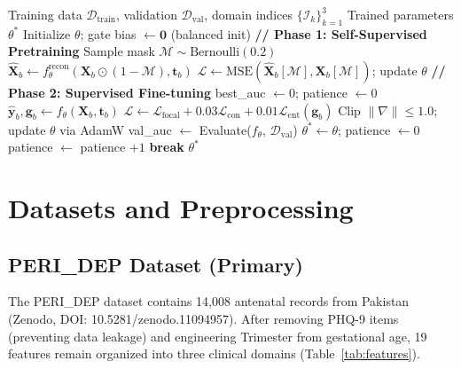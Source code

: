 \documentclass[12pt,a4paper]{article}
\begin{document}
\begin{algorithm}[htbp]
\caption{TH-DAT Complete Training Procedure}
\label{alg:thdat}
\begin{algorithmic}[1]
\REQUIRE Training data $\mathcal{D}_{\text{train}}$, validation $\mathcal{D}_{\text{val}}$, domain indices $\{\mathcal{I}_k\}_{k=1}^3$
\ENSURE Trained parameters $\theta^*$
\STATE Initialize $\theta$; gate bias $\leftarrow \mathbf{0}$ (balanced init)
\STATE \textbf{// Phase 1: Self-Supervised Pretraining}
        \STATE Sample mask $\mathcal{M} \sim \text{Bernoulli}(0.2)$
        \STATE $\hat{\mathbf{X}}_b \leftarrow f_\theta^{\text{recon}}(\mathbf{X}_b \odot (1 - \mathcal{M}), \mathbf{t}_b)$
        \STATE $\mathcal{L} \leftarrow \text{MSE}(\hat{\mathbf{X}}_b[\mathcal{M}], \mathbf{X}_b[\mathcal{M}])$; update $\theta$
    \ENDFOR
\ENDFOR
\STATE \textbf{// Phase 2: Supervised Fine-tuning}
\STATE best\_auc $\leftarrow 0$; patience $\leftarrow 0$
        \STATE $\hat{\mathbf{y}}_b, \mathbf{g}_b \leftarrow f_\theta(\mathbf{X}_b, \mathbf{t}_b)$
        \STATE $\mathcal{L} \leftarrow \mathcal{L}_{\text{focal}} + 0.03\mathcal{L}_{\text{con}} + 0.01\mathcal{L}_{\text{ent}}(\mathbf{g}_b)$
        \STATE Clip $\|\nabla\| \leq 1.0$; update $\theta$ via AdamW
    \ENDFOR
    \STATE val\_auc $\leftarrow$ Evaluate($f_\theta$, $\mathcal{D}_{\text{val}}$)
        \STATE $\theta^* \leftarrow \theta$; patience $\leftarrow 0$
    \ELSE
        \STATE patience $\leftarrow$ patience $+ 1$
    \ENDIF
     \STATE \textbf{break} \ENDIF
\ENDFOR
\RETURN $\theta^*$
\end{algorithmic}
\end{algorithm}

\section{Datasets and Preprocessing}

\subsection{PERI\_DEP Dataset (Primary)}

The PERI\_DEP dataset\cite{khan2025} contains 14,008 antenatal records from Pakistan (Zenodo, DOI: 10.5281/zenodo.11094957). After removing PHQ-9 items (preventing data leakage) and engineering Trimester from gestational age, 19 features remain organized into three clinical domains (Table~\ref{tab:features}).
\end{document}
